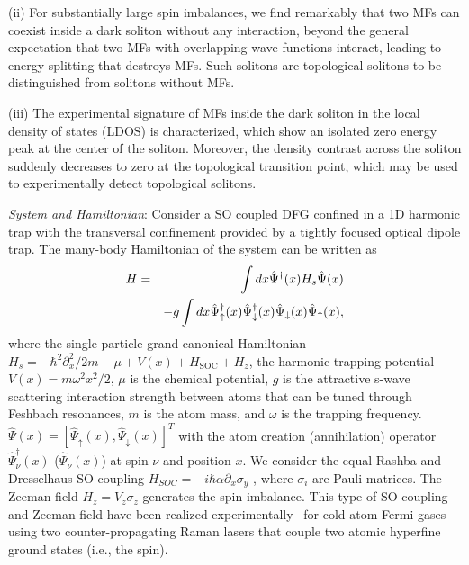 \documentclass[prl,aps,twocolumn,showpacs, floatfix]{revtex4}
\begin{document}
(ii) For substantially large spin imbalances, we find remarkably that two
MFs can coexist inside a dark soliton without any interaction, beyond the
general expectation that two MFs with overlapping wave-functions interact,
leading to energy splitting that destroys MFs. Such solitons are topological
solitons to be distinguished from solitons without MFs.

(iii) The experimental signature of MFs inside the dark soliton in the local
density of states (LDOS) is characterized, which show an isolated zero
energy peak at the center of the soliton. Moreover, the density contrast
across the soliton suddenly decreases to zero at the topological transition
point, which may be used to experimentally detect topological solitons.

\emph{System and Hamiltonian}: Consider a SO coupled DFG confined in a 1D
harmonic trap with the transversal confinement provided by a tightly focused
optical dipole trap. The many-body Hamiltonian of the system can be written
as
\begin{eqnarray}
H &=&\int d{x}\hat{\Psi}^{\dagger }({x})H_{s}\hat{\Psi}({x}) \\
&&-g\int d{x}\hat{\Psi}_{\uparrow }^{\dagger }({x})\hat{\Psi}_{\downarrow
}^{\dagger }({x})\hat{\Psi}_{\downarrow }({x})\hat{\Psi}_{\uparrow }({x}),
\notag
\end{eqnarray}%
where the single particle grand-canonical Hamiltonian $H_{s}=-\hbar
^{2}\partial _{x}^{2}/2m-\mu +V({x})+H_{\text{SOC}}+H_{z}$, the harmonic
trapping potential $V({x})=m\omega ^{2}x^{2}/2$, $\mu $ is the chemical
potential, $g$ is the attractive s-wave scattering interaction strength
between atoms that can be tuned through Feshbach resonances, $m$ is the atom
mass, and $\omega $ is the trapping frequency. $\hat{\Psi}({x})=[\hat{\Psi}%
_{\uparrow }({x}),\hat{\Psi}_{\downarrow }({x})]^{T}$ with the atom creation
(annihilation) operator $\hat{\Psi}_{\nu }^{\dagger }({x})$ ($\hat{\Psi}%
_{\nu }({x})$) at spin $\nu $ and position $x$. We consider the equal Rashba
and Dresselhaus SO coupling $H_{SOC}=-i\hbar \alpha \partial _{x}\sigma _{y}$%
, where $\sigma _{i}$ are Pauli matrices. The Zeeman field $%
H_{z}=V_{z}\sigma _{z}$ generates the spin imbalance. This type of SO
coupling and Zeeman field have been realized experimentally~\cite%
{Lin2011Nature,Jing2012PRL,Zwierlen2012PRL,PanJian2012PRL,
Qu2013PRA,Spilman2013PRL} for cold atom Fermi gases using two
counter-propagating Raman lasers that couple two atomic hyperfine ground
states (i.e., the spin).
\end{document}
